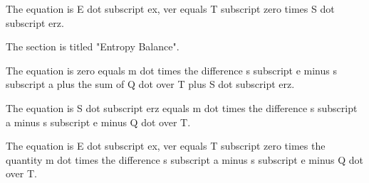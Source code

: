 The equation is E dot subscript ex, ver equals T subscript zero times S dot subscript erz.

The section is titled "Entropy Balance".

The equation is zero equals m dot times the difference s subscript e minus s subscript a plus the sum of Q dot over T plus S dot subscript erz.

The equation is S dot subscript erz equals m dot times the difference s subscript a minus s subscript e minus Q dot over T.

The equation is E dot subscript ex, ver equals T subscript zero times the quantity m dot times the difference s subscript a minus s subscript e minus Q dot over T.